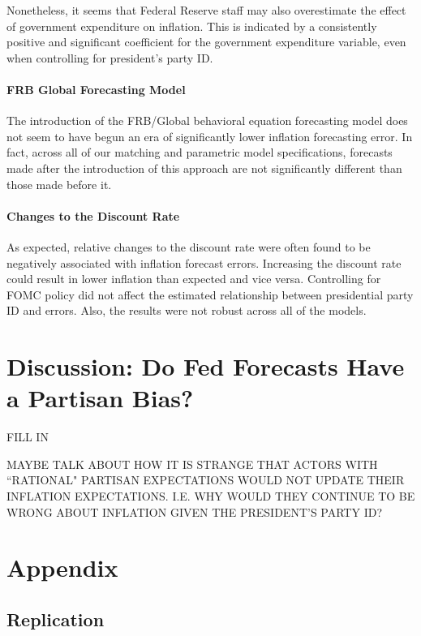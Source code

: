 \documentclass[a4paper]{article}\usepackage{graphicx, color}
\begin{document}
Nonetheless, it seems that Federal Reserve staff may also overestimate the effect of government expenditure on inflation. This is indicated by a consistently positive and significant coefficient for the government expenditure variable, even when controlling for president's party ID. 

\paragraph{FRB Global Forecasting Model}

The introduction of the FRB/Global behavioral equation forecasting model does not seem to have begun an era of significantly lower inflation forecasting error. In fact, across all of our matching and parametric model specifications, forecasts made after the introduction of this approach are not significantly different than those made before it. 

\paragraph{Changes to the Discount Rate}

As expected, relative changes to the discount rate were often found to be negatively associated with inflation forecast errors. Increasing the discount rate could result in lower inflation than expected and vice versa. Controlling for FOMC policy did not affect the estimated relationship between presidential party ID and errors. Also, the results were not robust across all of the models. 

\section*{Discussion: Do Fed Forecasts Have a Partisan Bias?}

FILL IN

MAYBE TALK ABOUT HOW IT IS STRANGE THAT ACTORS WITH ``RATIONAL" PARTISAN EXPECTATIONS WOULD NOT UPDATE THEIR INFLATION EXPECTATIONS. I.E. WHY WOULD THEY CONTINUE TO BE WRONG ABOUT INFLATION GIVEN THE PRESIDENT'S PARTY ID?

\clearpage
\section*{Appendix}

\subsection*{Replication}
\end{document}
